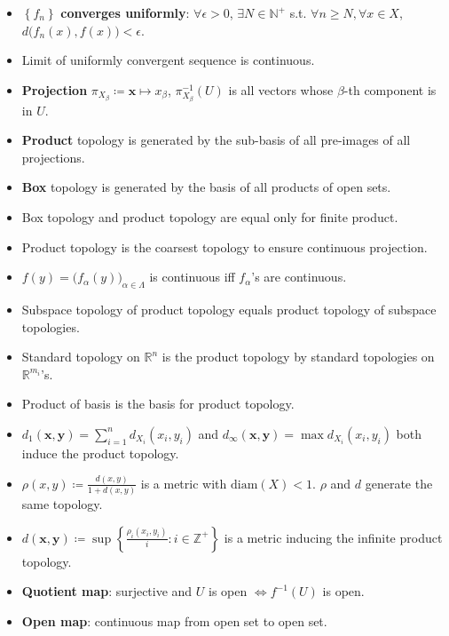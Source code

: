 \documentclass[10pt]{article}
\newcommand{\R}{\mathbb{R}} %
\newcommand{\N}{\mathbb{N}} %
\newcommand{\Z}{\mathbb{Z}} %
\begin{document}
\begin{multicols*}{3}
\begin{itemize}
            \item $\left\{f_n\right\}$ \textbf{converges uniformly}: $\forall \epsilon > 0$, $\exists N \in \N^+$ s.t. $\forall n \geq N, \forall x \in X$, $d\bigl(f_n\left(x\right), f\left(x\right)\bigr) < \epsilon$.
            \item Limit of uniformly convergent sequence is continuous.
            \item \textbf{Projection} $\pi_{X_{\beta}} \coloneqq \bm{x} \mapsto x_{\beta}$, $\pi_{X_{\beta}}^{-1}\left(U\right)$ is all vectors whose $\beta$-th component is in $U$.
            \item \textbf{Product} topology is generated by the sub-basis of all pre-images of all projections.
            \item \textbf{Box} topology is generated by the basis of all products of open sets.
            \item Box topology and product topology are equal only for finite product.
            \item Product topology is the coarsest topology to ensure continuous projection.
            \item $f\left(y\right) = \bigl(f_{\alpha}\left(y\right)\bigr)_{\alpha \in \Lambda}$ is continuous iff $f_{\alpha}$'s are continuous.
            \item Subspace topology of product topology equals product topology of subspace topologies.
            \item Standard topology on $\R^n$ is the product topology by standard topologies on $\R^{m_i}$'s.
            \item Product of basis is the basis for product topology.
            \item $d_1\left(\bm{x}, \bm{y}\right) = \sum_{i = 1}^{n}d_{X_i}\left(x_i, y_i\right)$ and $d_{\infty}\left(\bm{x}, \bm{y}\right) = \max d_{X_i}\left(x_i, y_i\right)$ both induce the product topology.
            \item $\rho\left(x, y\right) \coloneqq \frac{d\left(x, y\right)}{1 + d\left(x, y\right)}$ is a metric with $\mathrm{diam}\left(X\right) < 1$. $\rho$ and $d$ generate the same topology.
            \item $d\left(\bm{x}, \bm{y}\right) \coloneqq \sup \left\{\frac{\rho_{i}\left(x_i, y_i\right)}{i} \colon i \in \Z^+\right\}$ is a metric inducing the infinite product topology.
            \item \textbf{Quotient map}: surjective and $U$ is open $\iff f^{-1}\left(U\right)$ is open.
            \item \textbf{Open map}: continuous map from open set to open set.

\end{itemize}
\end{multicols*}
\end{document}
